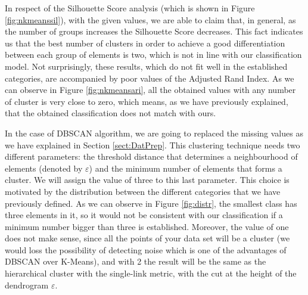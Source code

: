 In respect of the Silhouette Score analysis (which is shown in Figure \ref{fig:nkmeanssil}), with the given values, we are able to claim that, in general, as the number of groups increases the Silhouette Score decreases. This fact indicates us that the best number of clusters in order to achieve a good differentiation between each group of elements is two, which is not in line with our classification model. Not surprisingly, these results, which do not fit well in the established categories, are accompanied by poor values of the Adjusted Rand Index. As we can observe in Figure \ref{fig:nkmeansari}, all the obtained values with any number of cluster is very close to zero, which means, as we have previously explained, that the obtained classification does not match with ours.

In the case of DBSCAN algorithm, we are going to replaced the missing values as we have explained in Section \ref{sect:DatPrep}. This clustering technique needs two different parameters: the threshold distance that determines a neighbourhood of elements (denoted by $\varepsilon$) and the minimum number of elements that forms a cluster. We will assign the value of three to this last parameter. This choice is motivated by the distribution between the different categories that we have previously defined. As we can observe in Figure \ref{fig:distr}, the smallest class has three elements in it, so it would not be consistent with our classification if a minimum number bigger than three is established. Moreover, the value of one does not make sense, since all the points of your data set will be a cluster (we would loss the possibility of detecting noise which is one of the advantages of DBSCAN over K-Means), and with 2 the result will be the same as the hierarchical cluster \citep{nielsen2016hierarchical} with the single-link metric, with the cut at the height of the dendrogram $\varepsilon$.